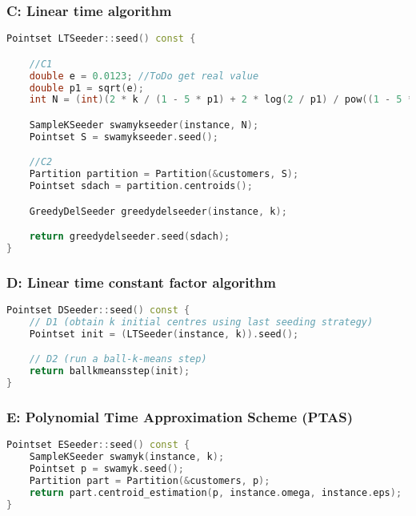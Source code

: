 \documentclass{beamer}
\begin{document}
  
    \begin{frame}[fragile]

    \frametitle{C: Linear time algorithm}
\begin{lstlisting}[language=C++]
Pointset LTSeeder::seed() const {

	//C1
	double e = 0.0123; //ToDo get real value
	double p1 = sqrt(e);
	int N = (int)(2 * k / (1 - 5 * p1) + 2 * log(2 / p1) / pow((1 - 5 * p1), 2));

	SampleKSeeder swamykseeder(instance, N);
	Pointset S = swamykseeder.seed();

	//C2
	Partition partition = Partition(&customers, S);
	Pointset sdach = partition.centroids();

	GreedyDelSeeder greedydelseeder(instance, k);

	return greedydelseeder.seed(sdach);
}
\end{lstlisting}
\end{frame}
  
      \begin{frame}[fragile]

    \frametitle{D: Linear time constant factor algorithm}
\begin{lstlisting}[language=C++]
Pointset DSeeder::seed() const {
    // D1 (obtain k initial centres using last seeding strategy)
	Pointset init = (LTSeeder(instance, k)).seed();

	// D2 (run a ball-k-means step)
	return ballkmeansstep(init);
}
\end{lstlisting}
\end{frame}
  
        \begin{frame}[fragile]

    \frametitle{E: Polynomial Time Approximation Scheme (PTAS)}
\begin{lstlisting}[language=C++]
Pointset ESeeder::seed() const {
	SampleKSeeder swamyk(instance, k);
	Pointset p = swamyk.seed();
	Partition part = Partition(&customers, p);
	return part.centroid_estimation(p, instance.omega, instance.eps);
}
\end{lstlisting}
\end{frame}
\end{document}

